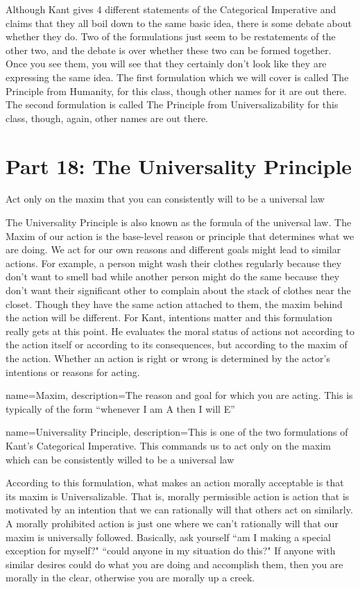 Although Kant gives 4 different statements of the Categorical Imperative and claims that they all boil down to the same basic idea, there is some debate about whether they do. Two of the formulations just seem to be restatements of the other two, and the debate is over whether these two can be formed together. Once you see them, you will see that they certainly don't look like they are expressing the same idea. The first formulation which we will cover is called The Principle from Humanity, for this class, though other names for it are out there. The second formulation is called The Principle from Universalizability for this class, though, again, other names are out there.

\chapter{Part 18: The Universality Principle}
\begin{center}
Act only on the maxim that you can consistently will to be a universal law
\end{center}
The \gls{Universality Principle} is also known as the formula of the universal law. The \Gls{Maxim} of our action is the base-level reason or principle that determines what we are doing. We act for our own reasons and different goals might lead to similar actions. For example, a person might wash their clothes regularly because they don't want to smell bad while another person might do the same because they don't want their significant other to complain about the stack of clothes near the closet. Though they have the same action attached to them, the maxim behind the action will be different.  For Kant, intentions matter and this formulation really gets at this point. He evaluates the moral status of actions not according to the action itself or according to its consequences, but according to the maxim of the action. Whether an action is right or wrong  is determined by the actor’s intentions or reasons for acting.

{
  name=Maxim,
  description={The reason and goal for which you are acting. This is typically of the form ``whenever I am A then I will E''}
}


{
  name=Universality Principle,
  description={This is one of the two formulations of Kant's Categorical Imperative. This commands us to act only on the maxim which can be consistently willed to be a universal law}
}


According to this formulation, what makes an action morally acceptable is that its maxim is \Gls{Universalizable}. That is, morally permissible action is action that is motivated by an intention that we can rationally will that others act on similarly. A morally prohibited action is just one where we can’t rationally will that our maxim is universally followed. Basically, ask yourself ``am I making a special exception for myself?" ``could anyone in my situation do this?" If anyone with similar desires could do what you are doing and accomplish them, then you are morally in the clear, otherwise you are morally up a creek.

